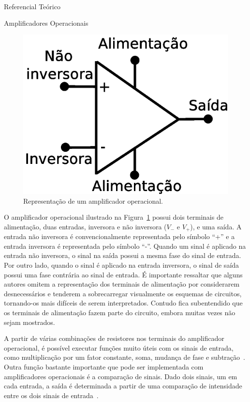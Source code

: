 \begin{chapter}{Referencial Teórico}
\begin{section}{Amplificadores Operacionais}
\begin{figure}[!h]
	\centering
	\begin{minipage}[c]{\textwidth}
	\centering
	\includegraphics[width=0.55\linewidth]{fig/opamp}
	\caption{Representação de um amplificador operacional.}
	\label{fig:opamp}
	\end{minipage}
\end{figure}

O amplificador operacional ilustrado na Figura~\ref{fig:opamp} possui dois
terminais de alimentação, duas entradas, inversora e não inversora ($V_{-}$ e
$V_{+}$), e uma saída. A entrada não inversora é convencionalmente representada
pelo símbolo ``+'' e a entrada inversora é representada pelo símbolo ``-''.
Quando um sinal é aplicado na entrada não inversora, o sinal na saída possui a
mesma fase do sinal de entrada. Por outro lado, quando o sinal é aplicado na
entrada inversora, o sinal de saída possui uma fase contrária ao sinal de
entrada. É importante ressaltar que alguns autores omitem a representação dos
terminais de alimentação por considerarem desnecessários e tenderem a
sobrecarregar visualmente os esquemas de circuitos, tornando-os mais difíceis de
serem interpretados. Contudo fica subentendido que os terminais de alimentação
fazem parte do circuito, embora muitas vezes não sejam mostrados.

A partir de várias combinações de resistores nos terminais do amplificador
operacional, é possível executar funções muito úteis com os sinais de entrada, 
como multiplicação por um fator constante, soma, mudança de fase e
subtração~\cite{Nilson09}. Outra função bastante importante que pode ser
implementada com amplificadores operacionais é a comparação de sinais. Dado dois
sinais, um em cada entrada, a saída é determinada a partir de uma comparação de
intensidade entre os dois sinais de entrada~\cite{Terrell96}.  
 


\end{section}
\end{chapter}

